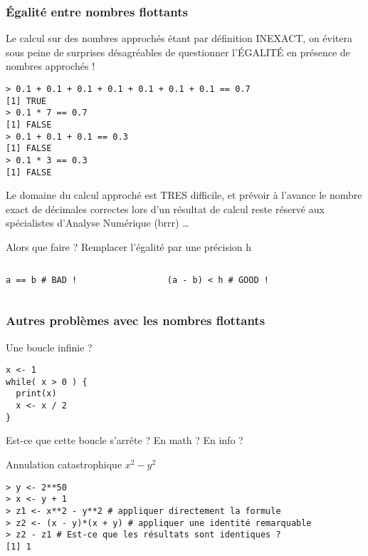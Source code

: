 \documentclass[10pt]{beamer}
\begin{document}
\begin{frame}[fragile]
  \frametitle{Égalité entre nombres flottants}
  Le calcul sur des nombres approchés étant par définition \alert{INEXACT}, on évitera sous peine de surprises désagréables de questionner l'\alert{ÉGALITÉ} en présence de nombres approchés !
  \begin{lstlisting}
> 0.1 + 0.1 + 0.1 + 0.1 + 0.1 + 0.1 + 0.1 == 0.7
[1] TRUE
> 0.1 * 7 == 0.7
[1] FALSE
> 0.1 + 0.1 + 0.1 == 0.3
[1] FALSE
> 0.1 * 3 == 0.3
[1] FALSE    
\end{lstlisting}

Le domaine du calcul approché est TRES difficile, et prévoir à l'avance le nombre exact de décimales correctes lors d'un résultat de calcul reste réservé aux spécialistes d'Analyse Numérique (brrr) \dots

\begin{block}{Alors que faire ? Remplacer l'égalité par une précision h}
\begin{columns}[t]
\begin{column}{0.48\textwidth}
  \begin{lstlisting}[style=editor]
a == b # BAD !
  \end{lstlisting}
\end{column}
\begin{column}{0.48\textwidth}
  \begin{lstlisting}[style=editor]
(a - b) < h # GOOD !    
  \end{lstlisting}
\end{column}
\end{columns}
  
\end{block}

\end{frame}

\begin{frame}[fragile]
  \frametitle{Autres problèmes avec les nombres flottants}


  \begin{exampleblock}{Une boucle infinie ?}
  \begin{lstlisting}[style=edblock]
x <- 1
while( x > 0 ) {
  print(x)
  x <- x / 2
}
\end{lstlisting}
Est-ce que cette boucle s'arrête ? En math ? En info ? 
\end{exampleblock}


\begin{exampleblock}{Annulation catastrophique $x^2 - y^2$}
  \begin{lstlisting}[style=block]
> y <- 2**50
> x <- y + 1
> z1 <- x**2 - y**2 # appliquer directement la formule
> z2 <- (x - y)*(x + y) # appliquer une identité remarquable
> z2 - z1 # Est-ce que les résultats sont identiques ?
[1] 1    
  \end{lstlisting}
\end{exampleblock}

\end{frame}
\end{document}
